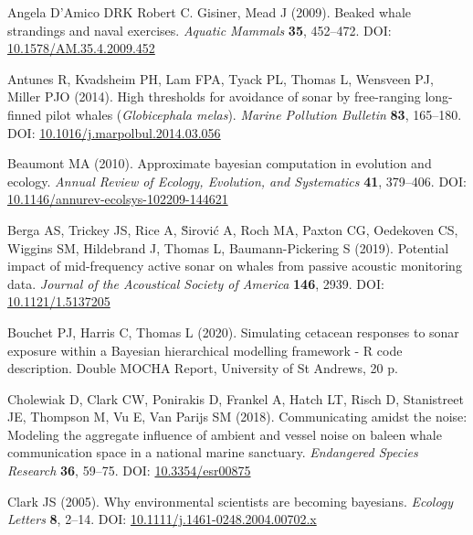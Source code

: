 \documentclass[
]{article}
\begin{document}
\hypertarget{refs}{}
\leavevmode\hypertarget{ref-Damico2009b}{}%
Angela D'Amico DRK Robert C. Gisiner, Mead J (2009). Beaked whale strandings and naval exercises. \emph{Aquatic Mammals} \textbf{35}, 452--472. DOI: \href{https://doi.org/10.1578/AM.35.4.2009.452}{10.1578/AM.35.4.2009.452}

\leavevmode\hypertarget{ref-Antunes2014}{}%
Antunes R, Kvadsheim PH, Lam FPA, Tyack PL, Thomas L, Wensveen PJ, Miller PJO (2014). High thresholds for avoidance of sonar by free-ranging long-finned pilot whales (\emph{Globicephala melas}). \emph{Marine Pollution Bulletin} \textbf{83}, 165--180. DOI: \href{https://doi.org/10.1016/j.marpolbul.2014.03.056}{10.1016/j.marpolbul.2014.03.056}

\leavevmode\hypertarget{ref-Beaumont2010}{}%
Beaumont MA (2010). Approximate bayesian computation in evolution and ecology. \emph{Annual Review of Ecology, Evolution, and Systematics} \textbf{41}, 379--406. DOI: \href{https://doi.org/10.1146/annurev-ecolsys-102209-144621}{10.1146/annurev-ecolsys-102209-144621}

\leavevmode\hypertarget{ref-Berga2019}{}%
Berga AS, Trickey JS, Rice A, S̆irović A, Roch MA, Paxton CG, Oedekoven CS, Wiggins SM, Hildebrand J, Thomas L, Baumann-Pickering S (2019). Potential impact of mid-frequency active sonar on whales from passive acoustic monitoring data. \emph{Journal of the Acoustical Society of America} \textbf{146}, 2939. DOI: \href{https://doi.org/10.1121/1.5137205}{10.1121/1.5137205}

\leavevmode\hypertarget{ref-Bouchet2020b}{}%
Bouchet PJ, Harris C, Thomas L (2020). Simulating cetacean responses to sonar exposure within a Bayesian hierarchical modelling framework - R code description. Double MOCHA Report, University of St Andrews, 20 p.

\leavevmode\hypertarget{ref-Cholewiak2018}{}%
Cholewiak D, Clark CW, Ponirakis D, Frankel A, Hatch LT, Risch D, Stanistreet JE, Thompson M, Vu E, Van Parijs SM (2018). Communicating amidst the noise: Modeling the aggregate influence of ambient and vessel noise on baleen whale communication space in a national marine sanctuary. \emph{Endangered Species Research} \textbf{36}, 59--75. DOI: \href{https://doi.org/10.3354/esr00875}{10.3354/esr00875}

\leavevmode\hypertarget{ref-Clark2005}{}%
Clark JS (2005). Why environmental scientists are becoming bayesians. \emph{Ecology Letters} \textbf{8}, 2--14. DOI: \href{https://doi.org/10.1111/j.1461-0248.2004.00702.x}{10.1111/j.1461-0248.2004.00702.x}
\end{document}
